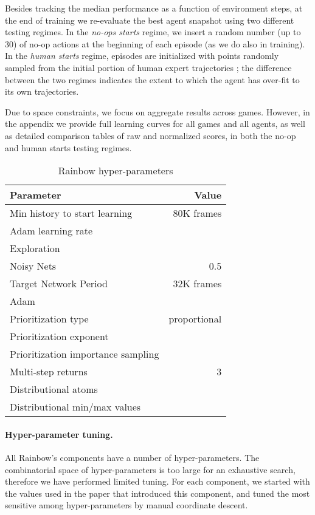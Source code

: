 \documentclass[letterpaper]{article} \usepackage{aaai18}  \usepackage{times}  \usepackage{helvet}  \usepackage{courier}  \usepackage{url}  \usepackage{graphicx}  \usepackage{amsmath,amssymb}
\begin{document}
Besides tracking the median performance as a function of environment steps, at the end of training we re-evaluate the best agent snapshot using two different testing regimes. In the \textit{no-ops starts} regime, we insert a random number (up to 30) of no-op actions at the beginning of each episode (as we do also in training). In the \textit{human starts} regime, episodes are initialized with points randomly sampled from  the initial portion of human expert trajectories \cite{Nair2015}; the difference between the two regimes indicates the extent to which the agent has over-fit to its own trajectories. 

Due to space constraints, we focus on aggregate results across games. However, in the appendix we provide full learning curves for all games and all agents, as well as detailed comparison tables of raw and normalized scores, in both the no-op and human starts testing regimes.

\begin{table}[b]
\centering
\vspace{-0.8em}
\small{
\begin{tabular}{ l | r}
 Parameter        & Value \\ 
\hline
 Min history to start learning  & 80K frames \\
 Adam learning rate       &  \\ 
 Exploration    &  \\
 Noisy Nets  & 0.5 \\
 Target Network Period  &  32K frames \\
 Adam  &   \\
 Prioritization type & proportional \\
 Prioritization exponent  &  \\
 Prioritization importance sampling  &   \\
 Multi-step returns  & 3 \\
 Distributional atoms &  \\
 Distributional min/max values &  \\
\end{tabular}}
\vspace{-0.3em}
\caption{Rainbow hyper-parameters}
\label{table-hyper}
\end{table}


\paragraph{Hyper-parameter tuning.}
All Rainbow's components have a number of hyper-parameters. The combinatorial space of hyper-parameters is too large for an exhaustive search, therefore we have performed limited tuning. For each component, we started with the values used in the paper that introduced this component, and tuned the most sensitive among hyper-parameters by manual coordinate descent.
\end{document}

